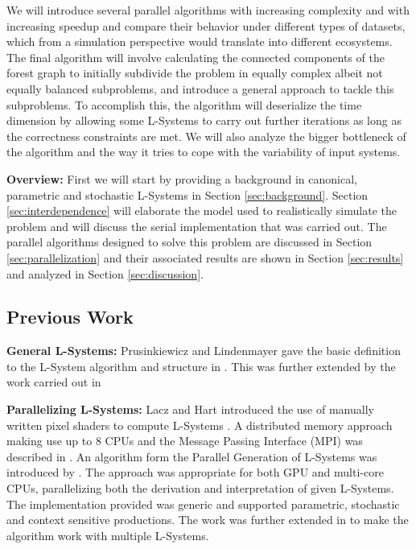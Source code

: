 \documentclass[letterpaper,twoside,11pt]{article}
\begin{document}
\begin{multicols}{2}
We will introduce several parallel algorithms with increasing complexity and with increasing speedup and compare their behavior under different types of datasets, which from a simulation perspective would translate into different ecosystems. The final algorithm will involve calculating the connected components of the forest graph to initially subdivide the problem in equally complex albeit not equally balanced subproblems, and introduce a general approach to tackle this subproblems. To accomplish this, the algorithm will deserialize the time dimension by allowing some L-Systems to carry out further iterations as long as the correctness constraints are met. We will also analyze the bigger bottleneck of the algorithm and the way it tries to cope with the variability of input systems.

\textbf{Overview:} First  we will start by providing a background in canonical, parametric and stochastic L-Systems in Section \ref{sec:background}. Section \ref{sec:interdependence} will elaborate the model used to realistically simulate the problem and will discuss the serial implementation that was carried out. The parallel algorithms designed to solve this problem are discussed in Section \ref{sec:parallelization} and their associated results are shown in Section \ref{sec:results} and analyzed in Section \ref{sec:discussion}.

\subsection{Previous Work} %
\label{sub:previous_work}
\textbf{General L-Systems:} Prusinkiewicz and Lindenmayer gave the basic definition to the L-System algorithm and structure in \cite{Prusinkiewicz:1996:ABP:235579}. This was further extended by the work carried out in \cite{Parish:2001:PMC:383259.383292,Prusinkiewicz:1994:ST:192161.192254,Prusinkiewicz:2001:UPI:383259.383291}

\textbf{Parallelizing L-Systems:} Lacz and Hart introduced the use of manually written pixel shaders to compute L-Systems \cite{Lacz04proceduralgeometry}. A distributed memory approach making use up to 8 CPUs and the Message Passing Interface (MPI) was described in \cite{4392608}. An algorithm form the Parallel Generation of L-Systems was introduced by \cite{LIPP-2009-PGL}. The approach was appropriate for both GPU and multi-core CPUs, parallelizing both the derivation and interpretation of given L-Systems. The implementation provided was generic and supported parametric, stochastic and context sensitive productions. The work was further extended in \cite{LIPP-2010-PGMS} to make the algorithm work with multiple L-Systems.


\end{multicols}
\end{document}
